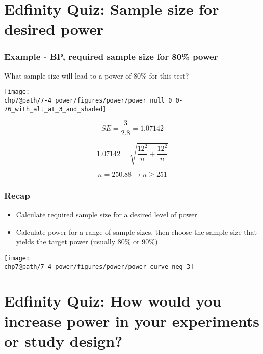 \documentclass[slidestop,compress,mathserif]{beamer}
\makeatletter
\def\chp7@path{../../Chp 7}
\makeatother
\begin{document}

\section{Edfinity Quiz: Sample size for desired power}


\begin{frame}
\frametitle{Example - BP, required sample size for 80\% power}

{\dq
{\footnotesize
What sample size will lead to a power of 80\% for this test?
}}

\pause

\texttt{[image: \\chp7@path/7-4\_power/figures/power/power\_null\_0\_0-76\_with\_alt\_at\_3\_and\_shaded]}

\pause

\[ SE = \frac{3}{2.8} = 1.07142 \]

\pause

\[ 1.07142 = \sqrt{ \frac{12^2}{n} + \frac{12^2}{n} } \]

\pause

\[ n = 250.88 \rightarrow n \ge 251 \]

\end{frame}


\begin{frame}
\frametitle{Recap}

\begin{itemize}
\item Calculate required sample size for a desired level of power
\item Calculate power for a range of sample sizes, then choose the sample size that yields the target power (usually 80\% or 90\%)
\end{itemize}
\begin{center}
\texttt{[image: \\chp7@path/7-4\_power/figures/power/power\_curve\_neg-3]}
\end{center}

\end{frame}


\section{Edfinity Quiz: How would you increase power in your experiments or study design?}  %
\end{document}
